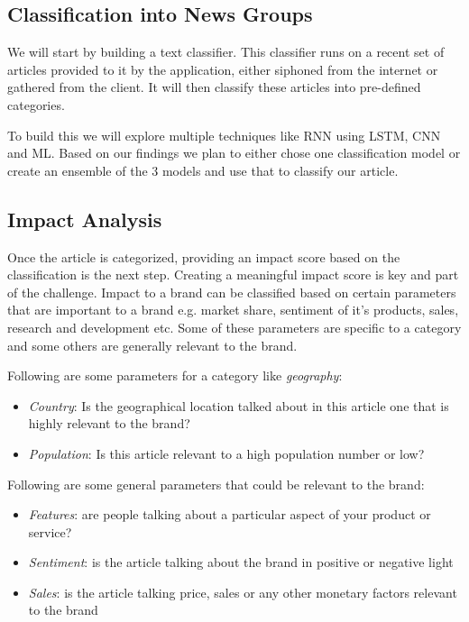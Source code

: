 \documentclass{article}
\begin{document}
\subsection{Classification into News Groups}

We will start by building a text classifier. This classifier runs on a recent set of articles provided to it by the application, either siphoned from the internet or gathered from the client. It will then classify these articles into pre-defined categories. 

To build this we will explore multiple techniques like RNN using LSTM, CNN and ML. Based on our findings we plan to either chose one classification model or create an ensemble of the 3 models and use that to classify our article. 

\subsection{Impact Analysis}
Once the article is categorized, providing an impact score based on the classification is the next step. Creating a meaningful impact score is key and part of the challenge. Impact to a brand can be classified based on certain parameters that are important to a brand e.g. market share, sentiment of it's products, sales, research and development etc. Some of these parameters are specific to a category and some others are generally relevant to the brand.

Following are some parameters for a category like \textit{geography}:
\begin{itemize}
	\item \textit{Country}: Is the geographical location talked about in this article one that is highly relevant to the brand?
	\item \textit{Population}: Is this article relevant to a high population number or low?
\end{itemize}

Following are some general parameters that could be relevant to the brand:

\begin{itemize}
	\item \textit{Features}: are people talking about a particular aspect of your product or service?
	\item \textit{Sentiment}: is the article talking about the brand in positive or negative light
	\item \textit{Sales}: is the article talking price, sales or any other monetary factors relevant to the brand
\end{itemize}
\end{document}
